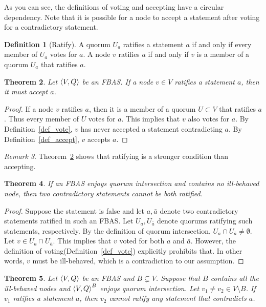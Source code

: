\documentclass[12pt, psamsfonts]{amsart}
\newtheorem{thm}{Theorem}[subsection]
\theoremstyle{definition}
\newtheorem{defn}[thm]{Definition}
\theoremstyle{remark}
\newtheorem{rem}[thm]{Remark}
\numberwithin{equation}{subsection}
\begin{document}
As you can see, the definitions of voting and accepting have a circular dependency.
Note that it is possible for a node to accept a statement after voting for a contradictory statement.

\begin{defn}[Ratify]\label{def_ratify}
    A quorum $U_a$ ratifies a statement $a$ if and only if every member of $U_a$ votes for $a$.
    A node $v$ ratifies $a$ if and only if $v$ is a member of a quorum $U_a$ that ratifies $a$.
\end{defn}

\begin{thm}\label{ratify_implies_accept}
    Let $\ev{V, Q}$ be an FBAS\@.
    If a node $v \in V$ ratifies a statement $a$, then it must accept $a$.
\end{thm}

\begin{proof}
    If a node $v$ ratifies $a$, then it is a member of a quorum $U \subset V$ that ratifies $a$.
    Thus every member of $U$ votes for $a$.
    This implies that $v$ also votes for $a$.
    By Definition~\ref{def_vote}, $v$ has never accepted a statement contradicting $a$.
    By Definition~\ref{def_accept}, $v$ accepts $a$.
\end{proof}

\begin{rem}
    Theorem~\ref{ratify_implies_accept} shows that ratifying is a stronger condition than accepting.
\end{rem}

\begin{thm}
    If an FBAS enjoys quorum intersection and contains no ill-behaved node, then two contradictory statements cannot be both ratified.
\end{thm}

\begin{proof}
    Suppose the statement is false and let $a, \bar{a}$ denote two contradictory statements ratified in such an FBAS\@.
    Let $U_a, U_{\bar{a}}$ denote quorums ratifying such statements, respectively.
    By the definition of quorum intersection, $U_a \cap U_{\bar{a}} \ne \emptyset$.
    Let $v \in U_a \cap U_{\bar{a}}$.
    This implies that $v$ voted for both $a$ and $\bar{a}$.
    However, the definition of voting(Definition~\ref{def_vote}) explicitly prohibits that.
    In other words, $v$ must be ill-behaved, which is a contradiction to our assumption.
\end{proof}

\begin{thm}\label{ill_behaved_ratify}
    Let $\ev{V, Q}$ be an FBAS and $B \subsetneq V$.
    Suppose that $B$ contains all the ill-behaved nodes and $\ev{V, Q}^B$ enjoys quorum intersection.
    Let $v_1 \ne v_2 \in V \setminus B$.
    If $v_1$ ratifies a statement $a$, then $v_2$ cannot ratify any statement that contradicts $a$.
\end{thm}
\end{document}
